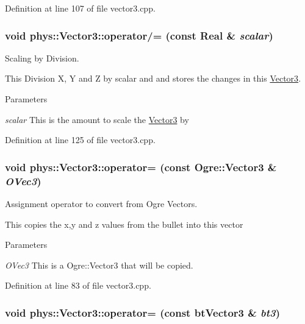 Definition at line 107 of file vector3.cpp.

\hypertarget{classphys_1_1Vector3_ae16bc8ff2f9897b52c36655a8ba8a1be}{
\subsubsection[{operator/=}]{\setlength{\rightskip}{0pt plus 5cm}void phys::Vector3::operator/= (const {\bf Real} \& {\em scalar})}}
\label{d5/d6a/classphys_1_1Vector3_ae16bc8ff2f9897b52c36655a8ba8a1be}


Scaling by Division. 

This Division X, Y and Z by scalar and and stores the changes in this \hyperlink{classphys_1_1Vector3}{Vector3}. 
\begin{DoxyParams}{Parameters}
\item[{\em scalar}]This is the amount to scale the \hyperlink{classphys_1_1Vector3}{Vector3} by \end{DoxyParams}


Definition at line 125 of file vector3.cpp.

\hypertarget{classphys_1_1Vector3_aea33e020934fe37bb415b034f3d057f1}{
\subsubsection[{operator=}]{\setlength{\rightskip}{0pt plus 5cm}void phys::Vector3::operator= (const Ogre::Vector3 \& {\em OVec3})}}
\label{d5/d6a/classphys_1_1Vector3_aea33e020934fe37bb415b034f3d057f1}


Assignment operator to convert from Ogre Vectors. 

This copies the x,y and z values from the bullet into this vector 
\begin{DoxyParams}{Parameters}
\item[{\em OVec3}]This is a Ogre::Vector3 that will be copied. \end{DoxyParams}


Definition at line 83 of file vector3.cpp.

\hypertarget{classphys_1_1Vector3_a7163daa9f9bee5214cc740f9d5ce9ed3}{
\subsubsection[{operator=}]{\setlength{\rightskip}{0pt plus 5cm}void phys::Vector3::operator= (const btVector3 \& {\em bt3})}}
\label{d5/d6a/classphys_1_1Vector3_a7163daa9f9bee5214cc740f9d5ce9ed3}


